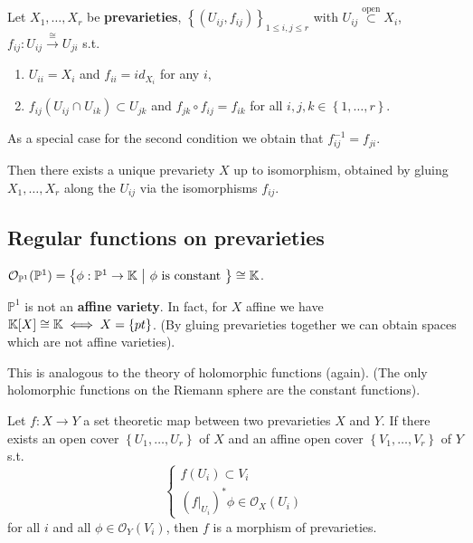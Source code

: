 \begin{lem}
	Let $X_1, \ldots, X_r$ be \textbf{prevarieties},
	$\left\{ \left(U_{ij}, f_{ij}\right) \right\}_{1 \leq i, j \leq r}$ with $U_{ij} \stackrel{\text{open}}{\subset} X_i$, $f_{ij}: U_{ij} \xrightarrow{\cong} U_{ji}$ s.t.
	\begin{enumerate}
		\item $U_{ii} = X_i$ and $f_{ii} = id_{X_i}$ for any $i$,
		\item $f_{ij} \left( U_{ij} \cap_{} U_{ik} \right) \subset U_{jk}$ and $f_{jk} \circ f_{ij} = f_{ik}$ for all $i,j,k \in \left\{ 1, \ldots, r \right\}$.
	\end{enumerate}
	As a special case for the second condition we obtain that $f_{ij}^{-1} = f_{ji}$.

	Then there exists a unique prevariety $X$ up to isomorphism, obtained by gluing $X_1, \ldots, X_r$ along the $U_{ij}$ via the isomorphisms $f_{ij}$.
\end{lem} 

\subsection{Regular functions on prevarieties}
\begin{prop}
	$\mathcal{O}_{\mathbb{P}^1}(\mathbb{P}^1) = \left\{ \phi: \mathbb{P}^1 \to \mathbb{K} \ \middle|\ \phi \text{ is constant } \right\} \cong \mathbb{K}$.
\end{prop} 
\begin{cor}
	$\mathbb{P}^1$ is not an \textbf{affine variety}.
	In fact, for $X$ affine we have $\mathbb{K}[X] \cong \mathbb{K} \iff X = \left\{ pt \right\}$.
	(By gluing prevarieties together we can obtain spaces which are not affine varieties).
\end{cor} 
\begin{rem}
	This is analogous to the theory of holomorphic functions (again).
	(The only holomorphic functions on the Riemann sphere are the constant functions).
\end{rem} 
\begin{lem}
	Let $f: X \to Y$ a set theoretic map between two prevarieties $X$ and $Y$.
	If there exists an open cover $\left\{ U_1, \ldots, U_r \right\}$ of $X$ and an affine open cover $\left\{ V_1, \ldots, V_r \right\}$ of $Y$ s.t.
	\begin{equation}
	\begin{cases}
		f \left( U_i \right) \subset V_i\\
		\left( \left.f\right|_{U_i} \right)^* \phi \in \mathcal{O}_X(U_i)
	\end{cases} 
	\end{equation} 
	for all $i$ and all $\phi \in \mathcal{O}_{Y} \left( V_i \right)$, then $f$ is a morphism of prevarieties.
\end{lem} 

